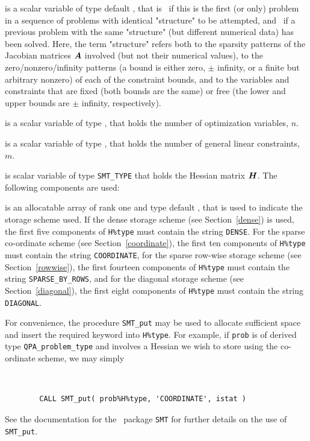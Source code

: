 \documentclass{galahad}
\newcommand{\packagename}{QPA}
\begin{document}
\begin{description}

 is a scalar variable of type default \logical, 
 that is \true\ if this is the first (or only) problem in a sequence of 
 problems with identical "structure" to be attempted, and \false\ if 
 a previous problem with the same "structure" (but different
 numerical data) has been solved. Here, the term "structure" refers both to 
 the sparsity patterns of the Jacobian matrices ${\bm{A}}$ involved 
 (but not their numerical values), to the zero/nonzero/infinity patterns 
 (a bound is either zero, $\pm$ infinity, or a finite but arbitrary 
 nonzero) of each of the constraint bounds, and to the variables and constraints
 that are fixed (both bounds are the same) or free (the lower and upper
 bounds are $\pm$ infinity, respectively).

 is a scalar variable of type \integer, 
 that holds the number of optimization variables, $n$.  
              
 is a scalar variable of type \integer, 
 that holds the number of general linear constraints, $m$.
              
 is scalar variable of type {\tt SMT\_TYPE} 
that holds the Hessian matrix ${\bm{H}}$. The following components
are used:

\begin{description}

 is an allocatable array of rank one and type default \character, 
that
is used to indicate the storage scheme used. If the dense storage scheme 
(see Section~\ref{dense}) is used, 
the first five components of {\tt H\%type} must contain the
string {\tt DENSE}.
For the sparse co-ordinate scheme (see Section~\ref{coordinate}), 
the first ten components of {\tt H\%type} must contain the
string {\tt COORDINATE},  
for the sparse row-wise storage scheme (see Section~\ref{rowwise}),
the first fourteen components of {\tt H\%type} must contain the
string {\tt SPARSE\_BY\_ROWS},
and for the diagonal storage scheme (see Section~\ref{diagonal}),
the first eight components of {\tt H\%type} must contain the
string {\tt DIAGONAL}.

For convenience, the procedure {\tt SMT\_put} 
may be used to allocate sufficient space and insert the required keyword
into {\tt H\%type}.
For example, if {\tt prob} is of derived type {\tt \packagename\_problem\_type}
and involves a Hessian we wish to store using the co-ordinate scheme,
we may simply
{\tt 
\begin{verbatim}
        CALL SMT_put( prob%H%type, 'COORDINATE', istat )
\end{verbatim}
}
\noindent
See the documentation for the \galahad\ package {\tt SMT} 
for further details on the use of {\tt SMT\_put}.


\end{description}
\end{description}
\end{document}
